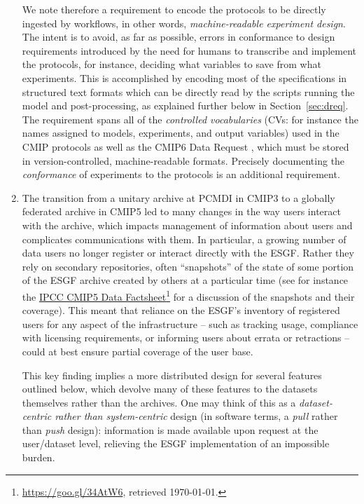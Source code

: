\documentclass[gmd,manuscript]{copernicus}
\newcommand{\pllabel}[1]{\label{p-#1}\linelabel{l-#1}}
\newcommand{\urlref}[2] {\href{#1}{#2}\footnote{\url{#1}, retrieved \today.}}
\begin{document}
\begin{enumerate}
  We note therefore a requirement to encode the protocols to be
  directly ingested by workflows, in other words,
  \emph{machine-readable experiment design}.
  \pllabel{RC1-14}
  The intent is to avoid, as far as possible, errors in conformance to
  design requirements introduced by the need for humans to transcribe
  and implement the protocols, for instance, deciding what variables
  to save from what experiments. This is accomplished by encoding most
  of the specifications in structured text formats which can be
  directly read by the scripts running the model and post-processing,
  as explained further below in Section~\ref{sec:dreq}. The
  requirement spans all of the \emph{controlled vocabularies} (CVs:
  for instance the names assigned to models, experiments, and output
  variables) used in the CMIP protocols as well as the CMIP6 Data
  Request \citep{ref:juckesetal2015}, which must be stored in
  version-controlled, machine-readable formats. Precisely documenting
  the \emph{conformance} of experiments to the protocols
  \citep{ref:lawrenceetal2012} is an additional requirement.
\item\label{snap} The transition from a unitary archive at PCMDI in
  CMIP3 to a globally federated archive in CMIP5 led to many changes
  in the way users interact with the archive, which impacts management
  of information about users and complicates communications with them.
  In particular, a growing number of data users no longer register or
  interact directly with the ESGF. Rather they rely on secondary
  repositories, often ``snapshots'' of the state of some portion of
  the ESGF archive created by others at a particular time (see for
  instance the \urlref{https://goo.gl/34AtW6}{IPCC CMIP5 Data
    Factsheet}
  \pllabel{RC1-15}
  for a discussion of the snapshots and their coverage). This meant
  that reliance on the ESGF's inventory of registered users for any
  aspect of the infrastructure -- such as tracking usage, compliance
  with licensing requirements, or informing users about errata or
  retractions -- could at best ensure partial coverage of the user
  base.

  This key finding implies a more distributed design for several
  features outlined below, which devolve many of these features to the
  datasets themselves rather than the archives. One may think of this
  as a \emph{dataset-centric rather than system-centric} design (in
  software terms, a \emph{pull} rather than \emph{push} design):
  information is made available upon request at the user/dataset
  level, relieving the ESGF implementation of an impossible burden.
\end{enumerate}
\end{document}
